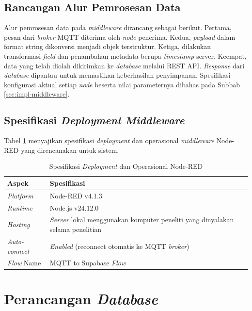 \subsection{Rancangan Alur Pemrosesan Data}

Alur pemrosesan data pada \textit{middleware} dirancang sebagai berikut. Pertama, pesan dari \textit{broker} MQTT diterima oleh \textit{node} penerima. Kedua, \textit{payload} dalam format string dikonversi menjadi objek terstruktur. Ketiga, dilakukan transformasi \textit{field} dan penambahan metadata berupa \textit{timestamp} server. Keempat, data yang telah diolah dikirimkan ke \textit{database} melalui REST API. \textit{Response} dari \textit{database} dipantau untuk memastikan keberhasilan penyimpanan. Spesifikasi konfigurasi aktual setiap \textit{node} beserta nilai parameternya dibahas pada Subbab \ref{sec:impl-middleware}.

\subsection{Spesifikasi \textit{Deployment} \textit{Middleware}}

Tabel \ref{tab:deployment-nodered} menyajikan spesifikasi \textit{deployment} dan operasional \textit{middleware} Node-RED yang direncanakan untuk sistem.

\begin{table}[H]
  \caption{Spesifikasi \textit{Deployment} dan Operasional Node-RED}
  \label{tab:deployment-nodered}
  \begin{tabularx}{\textwidth}{| l | X |}
    \hline
    \textbf{Aspek} & \textbf{Spesifikasi} \\
    \hline
    \textit{Platform} & Node-RED v4.1.3 \\
    \hline
    \textit{Runtime} & Node.js v24.12.0 \\
    \hline
    \textit{Hosting} & \textit{Server} lokal menggunakan komputer peneliti yang dinyalakan selama penelitian \\
    \hline
    \textit{Auto-connect} & \textit{Enabled} (reconnect otomatis ke MQTT \textit{broker}) \\
    \hline
    \textit{Flow} Name & MQTT to Supabase \textit{Flow} \\
    \hline
  \end{tabularx}
\end{table}

\section{Perancangan \textit{Database}}
\label{sec:perancangan-database}

